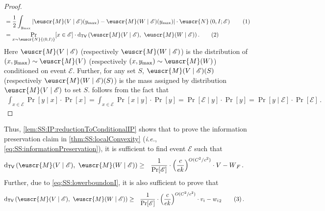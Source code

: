 \documentclass[11pt,letterpaper]{article}
\theoremstyle{plain}
\theoremstyle{definition}
\theoremstyle{remark}
\newcommand{\yesnum}{\addtocounter{equation}{1}\tag{\theequation}}
\def\abs#1{\left| #1 \right|}
\newcommand{\inparen}[1]{\ensuremath{\left(#1\right)}}
\let\norm\relax
\newcommand{\norm}[1]{\ensuremath{\left\lVert #1 \right\rVert}}
\newcommand{\evE}{\ensuremath{\mathscr{E}}}
\newcommand{\tv}[2]{\operatorname{d}_{\mathsf{TV}}{\inparen{#1,#2}}}
\newcommand{\customcal}[1]{\euscr{#1}}
\newcommand{\cM}{\customcal{M}}
\newcommand{\cN}{\customcal{N}}
\newcommand{\ie}{\emph{i.e.}}
\newcommand{\normal}[2]{\cN{\inparen{#1,#2}}}
\newcommand{\normalMass}[3]{\cN\inparen{#1, #2; #3}}
\newcommand{\ymax}{y_{\max}}
\begin{document}
{{{\begin{proof}
\begin{align*}
                &= \frac12 \int_{\ymax} \abs{\cM(V\mid \evE)(\ymax) - \cM(W\mid \evE)(\ymax)}\cdot \normalMass{0}{I}{\evE} \yesnum\label{eq:SS:integrateConditionalProbability} \\
                &= \Pr_{x\sim \normal{0}{I}}[x\in\evE]\cdot \tv{\cM(V\mid \evE)}{~\cM(W\mid \evE)}\,.
                \yesnum\label{eq:SS:conditionalInfoPreservationStatement}
            \end{align*} 
            Here $\cM(V\mid \evE)$ (respectively $\cM(W\mid \evE)$) is the distribution of $(x,\ymax)\sim \cM(V)$ (respectively $(x,\ymax)\sim \cM(W)$) conditioned on event $\evE$.
            Further, for any set $S$, $\cM(V\mid \evE)(S)$ (respectively $\cM(W\mid \evE)(S)$) is the mass assigned by distribution $\cM(V\mid \evE)$ to set $S$.
             follows from the fact that
            \begin{align*}
                \int_{x\in \evE} \Pr[y\mid x]\cdot \Pr[x]
                = \int_{x\in \evE} \Pr[x\mid y]\cdot \Pr[y] %
                = \Pr[\evE\mid y]\cdot \Pr[y] %
                = \Pr[y\mid \evE]\cdot \Pr[\evE]\,.
            \end{align*}
        \end{proof}
        Thus, \cref{lem:SS:IP:reductionToConditionalIP} shows that to prove the information preservation claim in \cref{thm:SS:localConvexity} (\ie{}, \cref{eq:SS:informationPreservation}), it is sufficient to find event $\evE$ such that 
        \begin{align*}
            \tv{\cM(V\mid \evE)}{~\cM(W\mid \evE)} 
            &\geq~~ \frac{1}{\Pr[\evE]} \cdot 
            \inparen{\frac{c}{ek}}^{{O({C^2/c^2}){}}}
            \cdot \norm{V - W}_F \,.
        \end{align*}
        Further, due to \cref{eq:SS:lowerboundonI}, it is also sufficient to prove that
        \begin{align*}
            \tv{\cM(V\mid \evE)}{~\cM(W\mid \evE)} 
            &\geq~~ \frac{1}{\Pr[\evE]} \cdot 
            \inparen{\frac{c}{ek}}^{{O({C^2/c^2}){}}}
            \cdot \norm{v_i - w_i}_2
            \yesnum\label{eq:SS:conditionalInfoPreservation}\,.
        \end{align*}
    }
}}
\end{document}
